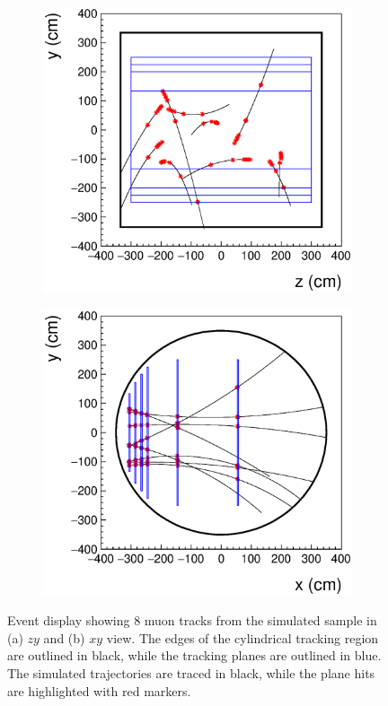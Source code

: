 \begin{figure}[t]
     \centering
     \begin{subfigure}[b]{0.48\textwidth}
         \centering
         \includegraphics[width=\textwidth]{figures/ch4-KF_NDGArLite/Toy/YZ_view.eps}
         \caption{}
         \label{fig:YZViewGArLite}
     \end{subfigure}
     \begin{subfigure}[b]{0.48\textwidth}
         \centering
         \includegraphics[width=\textwidth]{figures/ch4-KF_NDGArLite/Toy/XY_view.eps}
         \caption{}
         \label{fig:XYViewGArLite}
     \end{subfigure}
        \caption{Event display showing 8 muon tracks from the simulated sample in (a) $zy$ and (b) $xy$ view. The edges of the cylindrical tracking region are outlined in black, while the tracking planes are outlined in blue. The simulated trajectories are traced in black, while the plane hits are highlighted with red markers.} \label{fig:ViewGArLite}
\end{figure}

